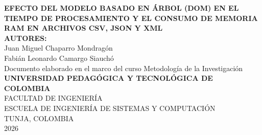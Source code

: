 \begin{titlepage}
\begin{center}

    \textbf{\Large EFECTO DEL MODELO BASADO EN ÁRBOL (DOM) EN EL TIEMPO DE PROCESAMIENTO Y EL CONSUMO DE MEMORIA RAM EN ARCHIVOS CSV, JSON Y XML}\\[3.0cm]

    \textbf{AUTORES:}\\[0.5cm]
    Juan Miguel Chaparro Mondragón\\
    Fabián Leonardo Camargo Siauchó\\[4.0cm]

    Documento elaborado en el marco del curso Metodología de la Investigación\\[3.5cm]

    \textbf{UNIVERSIDAD PEDAGÓGICA Y TECNOLÓGICA DE COLOMBIA}\\
    FACULTAD DE INGENIERÍA\\
    ESCUELA DE INGENIERÍA DE SISTEMAS Y COMPUTACIÓN\\
    TUNJA, COLOMBIA\\
    2026

\end{center}
\end{titlepage}